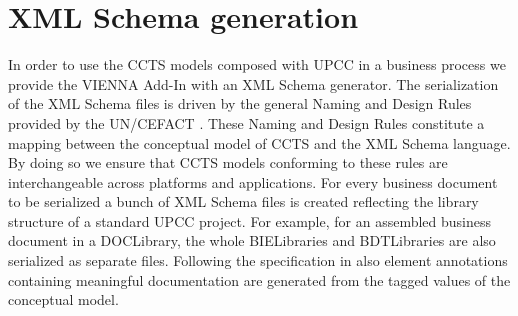 \documentclass{acm_proc_article-sp}
\begin{document}
%

\section{XML Schema generation}
In order to use the CCTS models composed with UPCC in a business process we provide the VIENNA Add-In with an XML Schema generator.  The serialization of the XML Schema files is driven by the general Naming and Design Rules provided by the UN/CEFACT \cite{CEFACT:NDR}. These Naming and Design Rules constitute a mapping between the conceptual model of CCTS and the XML Schema language. By doing so we ensure that CCTS models conforming to these rules are interchangeable across platforms and applications. For every business document to be serialized a bunch of XML Schema files is created reflecting the library structure of a standard UPCC project. For example, for an assembled business document in a DOCLibrary, the whole BIELibraries and BDTLibraries are also serialized as separate files. Following the specification in \cite{CEFACT:NDR} also element annotations containing meaningful documentation are generated from the tagged values of the conceptual model. 
\end{document}
